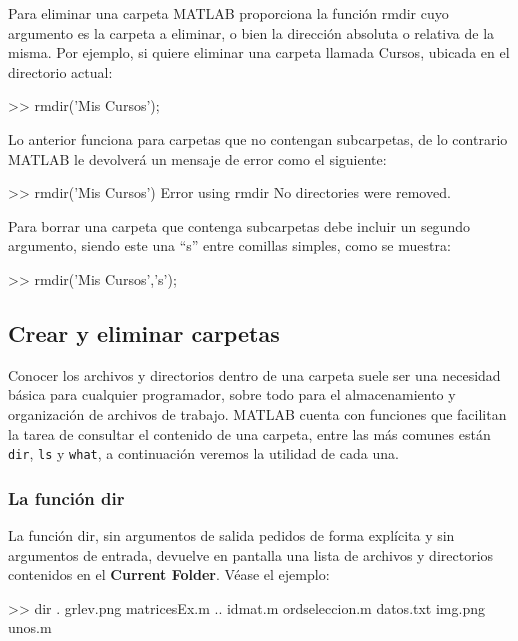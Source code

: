 Para eliminar una carpeta MATLAB proporciona la función rmdir cuyo
argumento es la carpeta a eliminar, o bien la dirección absoluta o
relativa de la misma. Por ejemplo, si quiere eliminar una carpeta
llamada Cursos, ubicada en el directorio actual:

\begin{matlab}
>> rmdir('Mis Cursos');
\end{matlab}

Lo anterior funciona para carpetas que no contengan subcarpetas, de lo
contrario MATLAB le devolverá un mensaje de error como el siguiente:

\begin{matlab}
>> rmdir('Mis Cursos')
Error using rmdir
No directories were removed.
\end{matlab}

Para borrar una carpeta que contenga subcarpetas debe incluir un segundo
argumento, siendo este una ``s'' entre comillas simples, como se
muestra:

\begin{matlab}
>> rmdir('Mis Cursos','s');
\end{matlab}

\subsection{Crear y eliminar carpetas}

Conocer los archivos y directorios dentro de una carpeta suele ser una
necesidad básica para cualquier programador, sobre todo para el
almacenamiento y organización de archivos de trabajo. MATLAB cuenta con
funciones que facilitan la tarea de consultar el contenido de una
carpeta, entre las más comunes están \texttt{dir}, \texttt{ls} y
\texttt{what}, a continuación veremos la utilidad de cada una.

\subsubsection{La función dir}

La función dir, sin argumentos de salida pedidos de forma explícita y
sin argumentos de entrada, devuelve en pantalla una lista de archivos y
directorios contenidos en el \textbf{Current Folder}. Véase el ejemplo:

\begin{matlab}
>> dir
.               grlev.png       matricesEx.m    
..              idmat.m         ordseleccion.m  
datos.txt       img.png         unos.m     
\end{matlab}

